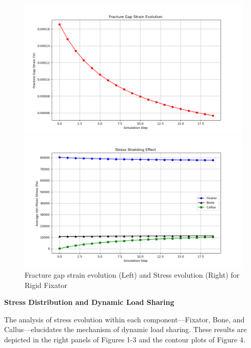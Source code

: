 \documentclass{article}
\begin{document}
\begin{figure}[H]
  \centering
  \begin{minipage}{0.45\textwidth}
    \centering
    \includegraphics[width=\textwidth]{../output_advanced/Rigid/gap_strain.png}
  \end{minipage}
  \hfill
  \begin{minipage}{0.45\textwidth}
    \centering
    \includegraphics[width=\textwidth]{../output_advanced/Rigid/stress_shielding.png}
  \end{minipage}
  \caption{Fracture gap strain evolution (Left) and Stress evolution (Right) for Rigid Fixator}
  \label{fig:rigid_gap_strain_stress_shielding}
\end{figure}


\textbf{Stress Distribution and Dynamic Load Sharing}

The analysis of stress evolution within each component—Fixator, Bone, and Callus—elucidates the mechanism of dynamic load sharing. These results are depicted in the right panels of Figures 1-3 and the contour plots of Figure 4.
\end{document}
